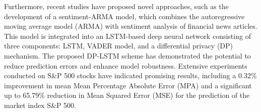 Furthermore, recent studies have proposed novel approaches, such as the development of a sentiment-ARMA model, which combines the autoregressive moving average model (ARMA) with sentiment analysis of financial news articles. 
This model is integrated into an LSTM-based deep neural network consisting of three components: LSTM, VADER model, and a differential privacy (DP) mechanism. 
The proposed DP-LSTM scheme has demonstrated the potential to reduce prediction errors and enhance model robustness. Extensive experiments conducted on S\&P 500 stocks have indicated promising results, 
including a 0.32\% improvement in mean Mean Percentage Absolute Error (MPA) 
and a significant up to 65.79\% reduction in Mean Squared Error (MSE) for the prediction of the market index S\&P 500.





